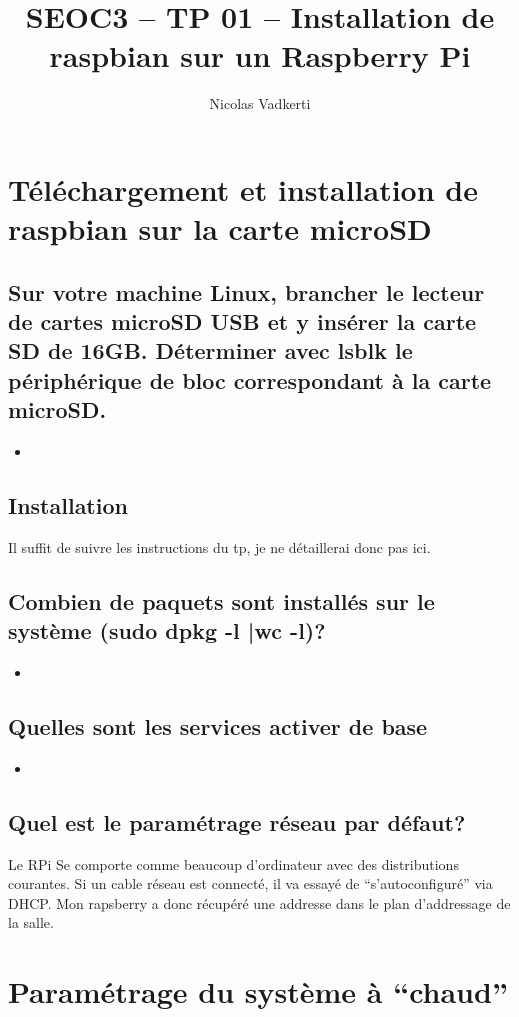 \documentclass[a4paper,10pt]{article}
\title{SEOC3 – TP 01 – Installation de raspbian sur un Raspberry Pi}
\author{Nicolas Vadkerti}
\newcommand{\insertcode}[2]{\begin{itemize}\item[]\end{itemize}}
\begin{document}
\maketitle



\section{Téléchargement et installation de raspbian sur la carte microSD}
\subsection{Sur votre machine Linux, brancher le lecteur de cartes microSD USB et y insérer la carte SD de 16GB. Déterminer avec lsblk le périphérique de bloc correspondant à la carte microSD.}


\insertcode{commande/1.txt}{LSBLK output}

\subsection{Installation}
Il suffit de suivre les instructions du tp, je ne détaillerai donc pas ici.

\subsection{Combien de paquets sont installés sur le système (sudo dpkg -l |wc -l)?}
\insertcode{commande/2.txt}{dpkg output}
\newpage
\subsection{Quelles sont les services activer de base}
\insertcode{commande/3.txt}{Service activé de base}
\subsection{Quel est le paramétrage réseau par défaut?}
Le RPi Se comporte comme beaucoup d'ordinateur avec des distributions courantes. Si un cable réseau est connecté, il va essayé de ``s'autoconfiguré''  via DHCP. Mon rapsberry a donc récupéré une addresse dans le plan d'addressage de la salle.





\section{Paramétrage du système à ``chaud''}
\end{document}
